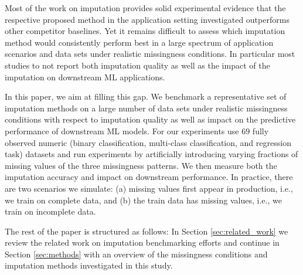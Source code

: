 Most of the work on imputation provides solid experimental evidence that the respective proposed method in the application setting investigated outperforms other competitor baselines. Yet it remains difficult to assess which imputation method would consistently perform best in a large spectrum of application scenarios and data sets under realistic missingness conditions. In particular most studies to not report both imputation quality as well as the impact of the imputation on downstream ML applications.

In this paper, we aim at filling this gap. We benchmark a representative set of imputation methods on a large number of data sets under realistic missingness conditions with respect to imputation quality as well as impact on the predictive performance of downstream ML models. For our experiments use $69$ fully observed numeric (binary classification, multi-class classification, and regression task) datasets and run experiments by artificially introducing varying fractions of missing values of the three missingness patterns. We then measure both the imputation accuracy and impact on downstream performance. In practice, there are two scenarios we simulate: (a) missing values first appear in production, i.e., we train on complete data, and (b) the train data has missing values, i.e., we train on incomplete data.

The rest of the paper is structured as follows: In Section \ref{sec:related_work} we review the related work on imputation benchmarking efforts and continue in Section \ref{sec:methods} with an overview of the missingness conditions and imputation methods investigated in this study.
